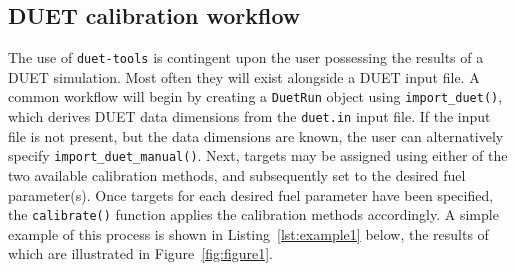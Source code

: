 \documentclass[preprint,12pt,a4paper]{elsarticle}
\begin{document}
\subsection{DUET calibration workflow}
The use of \texttt{duet-tools} is contingent upon the user possessing the results of a DUET simulation.
Most often they will exist alongside a DUET input file.
A common workflow will begin by creating a \texttt{DuetRun} object using \texttt{import\_duet()}, which derives DUET data dimensions from the \texttt{duet.in} input file.
If the input file is not present, but the data dimensions are known, the user can alternatively specify \texttt{import\_duet\_manual()}.
Next, targets may be assigned using either of the two available calibration methods, and subsequently set to the desired fuel parameter(s).
Once targets for each desired fuel parameter have been specified, the \texttt{calibrate()} function applies the calibration methods accordingly.
A simple example of this process is shown in Listing~\ref{lst:example1} below, the results of which are illustrated in Figure~\ref{fig:figure1}.\newline
\end{document}
